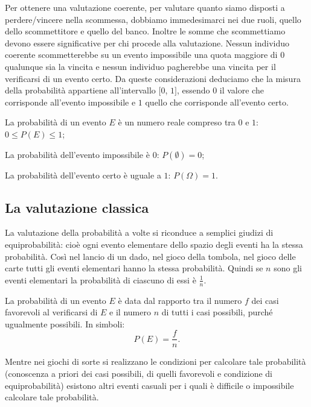 Per ottenere una valutazione coerente, per valutare quanto siamo disposti a perdere/{}vincere nella scommessa, dobbiamo immedesimarci nei due ruoli, quello dello scommettitore e quello del banco. Inoltre le somme che scommettiamo devono essere significative per chi procede alla valutazione.
Nessun individuo coerente scommetterebbe su un evento impossibile una quota maggiore di 0 qualunque sia la vincita e nessun individuo pagherebbe una vincita per il verificarsi di un evento certo.
Da queste considerazioni deduciamo che la misura della probabilità appartiene all'intervallo $[0$, $1]$, essendo $0$ il valore che corrisponde all'evento impossibile e $1$ quello che corrisponde all'evento certo.

\begin{postulato}\label{post:probabilita}
La probabilità di un evento $E$ è un numero reale compreso tra $0$ e $1$: $0\le P(E)\le 1$;

La probabilità dell'evento impossibile è $0$: $P(\emptyset)=0$;

La probabilità dell'evento certo è uguale a $1$: $P(\Omega)=1$.
\end{postulato}

\subsection{La valutazione classica}

La valutazione della probabilità a volte si riconduce a semplici giudizi di equiprobabilità: cioè ogni evento elementare dello spazio degli eventi ha la stessa probabilità. Così nel lancio di un dado, nel gioco della tombola, nel gioco delle carte tutti gli eventi elementari hanno la stessa probabilità. Quindi se $n$ sono gli eventi elementari la probabilità di ciascuno di essi è $\frac 1 n$.

La probabilità di un evento $E$ è data dal rapporto tra il numero $f$ dei casi favorevoli al verificarsi di $E$ e il numero $n$ di tutti i casi possibili, purché ugualmente possibili. In simboli: \[P(E)=\dfrac f n.\]

Mentre nei giochi di sorte si realizzano le condizioni per calcolare tale probabilità (conoscenza a priori dei casi possibili, di quelli favorevoli e condizione di equiprobabilità) esistono altri eventi casuali per i quali è difficile o impossibile calcolare tale probabilità.

